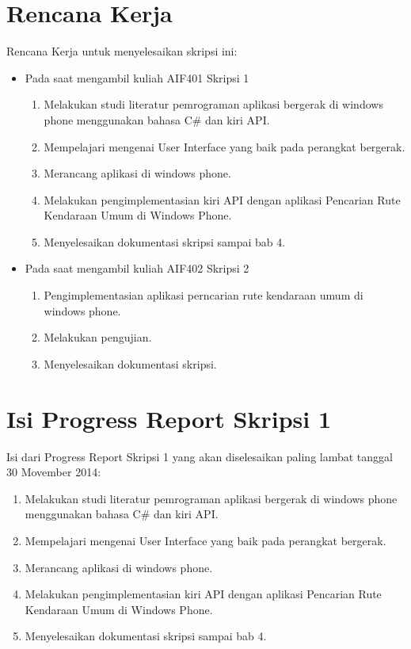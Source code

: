 \documentclass[a4paper,twoside]{article}
\begin{document}
\section{Rencana Kerja}
	Rencana Kerja untuk menyelesaikan skripsi ini:
	\begin{itemize}
		\item Pada saat mengambil kuliah AIF401 Skripsi 1
		\begin{enumerate}
			\item Melakukan studi literatur pemrograman aplikasi bergerak di windows phone menggunakan bahasa C\# dan kiri API.
			\item Mempelajari mengenai User Interface yang baik pada perangkat bergerak.
			\item Merancang aplikasi di windows phone.			
			\item Melakukan pengimplementasian kiri API dengan aplikasi Pencarian Rute Kendaraan Umum di Windows Phone.
			\item Menyelesaikan dokumentasi skripsi sampai bab 4.
		\end{enumerate}
	\end{itemize}
	\begin{itemize}
		\item Pada saat mengambil kuliah AIF402 Skripsi 2
		\begin{enumerate}
			\item Pengimplementasian aplikasi perncarian rute kendaraan umum di windows phone.
			\item Melakukan pengujian.
			\item Menyelesaikan dokumentasi skripsi.
		\end{enumerate}
	\end{itemize}
	
\section{Isi Progress Report Skripsi 1}
Isi dari Progress Report Skripsi 1 yang akan diselesaikan paling lambat tanggal 30 Movember 2014:
\begin{enumerate}
	\item Melakukan studi literatur pemrograman aplikasi bergerak di windows phone menggunakan bahasa C\# dan kiri API.
	\item Mempelajari mengenai User Interface yang baik pada perangkat bergerak.
	\item Merancang aplikasi di windows phone.			
	\item Melakukan pengimplementasian kiri API dengan aplikasi Pencarian Rute Kendaraan Umum di Windows Phone.
	\item Menyelesaikan dokumentasi skripsi sampai bab 4.
\end{enumerate}	
\end{document}

